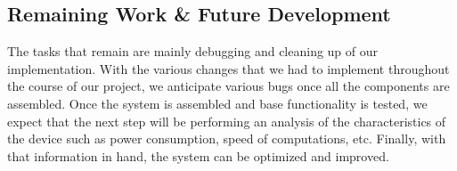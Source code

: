 \documentclass{article}
\begin{document}
\subsection{Remaining Work \& Future Development}
The tasks that remain are mainly debugging and cleaning up of our implementation. With the various changes that we had to implement throughout the course of our project, we anticipate various bugs once all the components are assembled. Once the system is assembled and base functionality is tested, we expect that the next step will be performing an analysis of the characteristics of the device such as power consumption, speed of computations, etc. Finally, with that information in hand, the system can be optimized and improved.


\newpage



	
\end{document}
